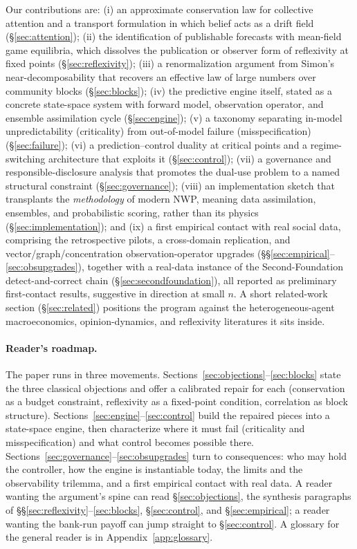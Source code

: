 \documentclass[11pt]{article}
\begin{document}
Our contributions are: (i) an approximate conservation law for collective attention and a transport formulation in which belief acts as a drift field (\S\ref{sec:attention}); (ii) the identification of publishable forecasts with mean-field game equilibria, which dissolves the publication or observer form of reflexivity at fixed points (\S\ref{sec:reflexivity}); (iii) a renormalization argument from Simon's near-decomposability that recovers an effective law of large numbers over community blocks (\S\ref{sec:blocks}); (iv) the predictive engine itself, stated as a concrete state-space system with forward model, observation operator, and ensemble assimilation cycle (\S\ref{sec:engine}); (v) a taxonomy separating in-model unpredictability (criticality) from out-of-model failure (misspecification) (\S\ref{sec:failure}); (vi) a prediction--control duality at critical points and a regime-switching architecture that exploits it (\S\ref{sec:control}); (vii) a governance and responsible-disclosure analysis that promotes the dual-use problem to a named structural constraint (\S\ref{sec:governance}); (viii) an implementation sketch that transplants the \emph{methodology} of modern NWP, meaning data assimilation, ensembles, and probabilistic scoring, rather than its physics (\S\ref{sec:implementation}); and (ix) a first empirical contact with real social data, comprising the retrospective pilots, a cross-domain replication, and vector/graph/concentration observation-operator upgrades (\S\S\ref{sec:empirical}--\ref{sec:obsupgrades}), together with a real-data instance of the Second-Foundation detect-and-correct chain (\S\ref{sec:secondfoundation}), all reported as preliminary first-contact results, suggestive in direction at small $n$. A short related-work section (\S\ref{sec:related}) positions the program against the heterogeneous-agent macroeconomics, opinion-dynamics, and reflexivity literatures it sits inside.

\paragraph{Reader's roadmap.} The paper runs in three movements. Sections~\ref{sec:objections}--\ref{sec:blocks} state the three classical objections and offer a calibrated repair for each (conservation as a budget constraint, reflexivity as a fixed-point condition, correlation as block structure). Sections~\ref{sec:engine}--\ref{sec:control} build the repaired pieces into a state-space engine, then characterize where it must fail (criticality and misspecification) and what control becomes possible there. Sections~\ref{sec:governance}--\ref{sec:obsupgrades} turn to consequences: who may hold the controller, how the engine is instantiable today, the limits and the observability trilemma, and a first empirical contact with real data. A reader wanting the argument's spine can read \S\ref{sec:objections}, the synthesis paragraphs of \S\S\ref{sec:reflexivity}--\ref{sec:blocks}, \S\ref{sec:control}, and \S\ref{sec:empirical}; a reader wanting the bank-run payoff can jump straight to \S\ref{sec:control}. A glossary for the general reader is in Appendix~\ref{app:glossary}.
\end{document}
